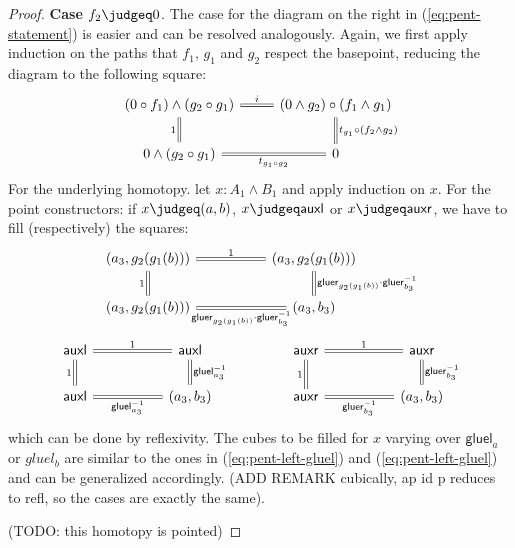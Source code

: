 \documentclass{article}
\newcommand{\smsh}{\wedge}
\newcommand{\tr}{\cdot}
\renewcommand{\o}{\ensuremath{\circ}}
\newcommand{\auxl}{\mathsf{auxl}}
\newcommand{\auxr}{\mathsf{auxr}}
\newcommand{\gluel}{\mathsf{gluel}}
\newcommand{\gluer}{\mathsf{gluer}}
\newcommand{\sy}{^{-1}}
\begin{document}
\begin{proof}
	\textbf{Case $f_2\judgeq 0$}. The case for the diagram on the right in (\ref{eq:pent-statement}) is easier and can be resolved analogously. Again, we first apply induction on the paths that $f_1$, $g_1$ and $g_2$ respect the basepoint, reducing the diagram to the following square:
	\begin{equation}\label{eq:pent-right-all}
	\begin{tikzcd}
		(0 \o f_1)\smsh (g_2 \o g_1)
			\arrow[r, equals,"i"]
			\arrow[d, swap, equals,"1"]
		& (0 \smsh g_2)\o (f_1 \smsh g_1)
			\arrow[d,equals,"t_{g_1}\o (f_2\smsh g_2)"]
		\\
		0 \smsh (g_2 \o g_1)
			\arrow[r, swap, equals,"t_{g_1 \o g_2}"]
		& 0
	\end{tikzcd}
	\end{equation}
	For the underlying homotopy. let $x : A_1 \smsh B_1$ and apply induction on $x$. For the point constructors: if $x \judgeq (a,b)$, $x \judgeq \auxl$ or $x \judgeq \auxr$, we have to fill (respectively) the squares:
	\begin{equation}\label{eq:pent-right-ab}
	\begin{tikzcd}[column sep=5em]
	(a_3,g_2(g_1(b)))
      	\arrow[r, equals,"1"]
      	\arrow[d,swap,equals,"1"]
	& (a_3,g_2(g_1(b)))
		\arrow[d,equals,"\gluer_{g_2(g_1(b))}\tr\gluer_{b_3}\sy"]
	\\
	(a_3,g_2(g_1(b)))
		\arrow[r,swap,equals,"\gluer_{g_2(g_1(b))}\tr\gluer_{b_3}\sy"]
	& (a_3,b_3)	
	\end{tikzcd}
	\end{equation}
	\begin{equation}\label{eq:pent-right-aux}
    \begin{tikzcd}[column sep=5em]
	\auxl
      	\arrow[r, equals,"1"]
    	\arrow[d,swap,equals,"1"]
	& \auxl
		\arrow[d,equals,"\gluel_{a_3}\sy"]
	& \auxr
		\arrow[r, equals, "1"]
		\arrow[d, swap, equals, "1"]
	& \auxr
		\arrow[d, equals, "\gluer_{b_3}\sy"]
	\\
	\auxl
		\arrow[r,swap, equals,"\gluel_{a_3}\sy"]
	& (a_3, b_3)
	& \auxr
		\arrow[r, swap, equals, "\gluer_{b_3}\sy"]
	& (a_3, b_3)
    \end{tikzcd}
	\end{equation}
	which can be done by reflexivity. The cubes to be filled for $x$ varying over $\gluel_a$ or $		gluel_b$ are similar to the ones in (\ref{eq:pent-left-gluel}) and (\ref{eq:pent-left-gluel}) and can be generalized accordingly. (ADD REMARK cubically, ap id p reduces to refl, so the cases are exactly the same).

	(TODO: this homotopy is pointed)
\end{proof}
\end{document}
